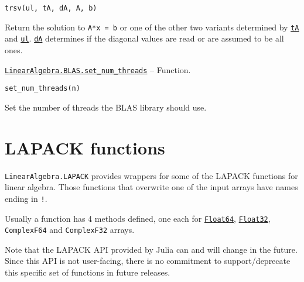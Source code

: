 \begin{adjustwidth}{2em}{0pt}


\begin{verbatim}
trsv(ul, tA, dA, A, b)
\end{verbatim}

Return the solution to \texttt{A*x = b} or one of the other two variants determined by \hyperlink{15951037910221396131}{\texttt{tA}} and \hyperlink{13880289478825450693}{\texttt{ul}}. \hyperlink{285101993251198425}{\texttt{dA}} determines if the diagonal values are read or are assumed to be all ones.



\end{adjustwidth}
\hypertarget{2145233402822007277}{} 
\hyperlink{2145233402822007277}{\texttt{LinearAlgebra.BLAS.set\_num\_threads}}  -- {Function.}

\begin{adjustwidth}{2em}{0pt}


\begin{verbatim}
set_num_threads(n)
\end{verbatim}

Set the number of threads the BLAS library should use.



\end{adjustwidth}

\hypertarget{12227093091679014988}{}


\section{LAPACK functions}



\texttt{LinearAlgebra.LAPACK} provides wrappers for some of the LAPACK functions for linear algebra.  Those functions that overwrite one of the input arrays have names ending in \texttt{{\textquotesingle}!{\textquotesingle}}.



Usually a function has 4 methods defined, one each for \hyperlink{5027751419500983000}{\texttt{Float64}}, \hyperlink{8101639384272933082}{\texttt{Float32}}, \texttt{ComplexF64} and \texttt{ComplexF32} arrays.



Note that the LAPACK API provided by Julia can and will change in the future. Since this API is not user-facing, there is no commitment to support/deprecate this specific set of functions in future releases.


